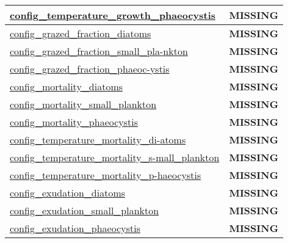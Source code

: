 {\begin{center}
\begin{longtable}{| p{2.0in} || p{4.0in} |}
    \hyperref[subsec:nm_sec_config_temperature_growth_phaeocystis]{config\_temperature\_growth\_phaeocystis} & {\bf \color{red} MISSING} \\
    \hline
    \hyperref[subsec:nm_sec_config_grazed_fraction_diatoms]{config\_grazed\_fraction\_diatoms} & {\bf \color{red} MISSING} \\
    \hline
    \hyperref[subsec:nm_sec_config_grazed_fraction_small_plankton]{config\_grazed\_fraction\_small\_pla-}\hyperref[subsec:nm_sec_config_grazed_fraction_small_plankton]{nkton}& {\bf \color{red} MISSING} \\
    \hline
    \hyperref[subsec:nm_sec_config_grazed_fraction_phaeocystis]{config\_grazed\_fraction\_phaeoc-}\hyperref[subsec:nm_sec_config_grazed_fraction_phaeocystis]{ystis}& {\bf \color{red} MISSING} \\
    \hline
    \hyperref[subsec:nm_sec_config_mortality_diatoms]{config\_mortality\_diatoms} & {\bf \color{red} MISSING} \\
    \hline
    \hyperref[subsec:nm_sec_config_mortality_small_plankton]{config\_mortality\_small\_plankton} & {\bf \color{red} MISSING} \\
    \hline
    \hyperref[subsec:nm_sec_config_mortality_phaeocystis]{config\_mortality\_phaeocystis} & {\bf \color{red} MISSING} \\
    \hline
    \hyperref[subsec:nm_sec_config_temperature_mortality_diatoms]{config\_temperature\_mortality\_di-}\hyperref[subsec:nm_sec_config_temperature_mortality_diatoms]{atoms}& {\bf \color{red} MISSING} \\
    \hline
    \hyperref[subsec:nm_sec_config_temperature_mortality_small_plankton]{config\_temperature\_mortality\_s-}\hyperref[subsec:nm_sec_config_temperature_mortality_small_plankton]{mall\_plankton}& {\bf \color{red} MISSING} \\
    \hline
    \hyperref[subsec:nm_sec_config_temperature_mortality_phaeocystis]{config\_temperature\_mortality\_p-}\hyperref[subsec:nm_sec_config_temperature_mortality_phaeocystis]{haeocystis}& {\bf \color{red} MISSING} \\
    \hline
    \hyperref[subsec:nm_sec_config_exudation_diatoms]{config\_exudation\_diatoms} & {\bf \color{red} MISSING} \\
    \hline
    \hyperref[subsec:nm_sec_config_exudation_small_plankton]{config\_exudation\_small\_plankton} & {\bf \color{red} MISSING} \\
    \hline
    \hyperref[subsec:nm_sec_config_exudation_phaeocystis]{config\_exudation\_phaeocystis} & {\bf \color{red} MISSING} \\

\end{longtable}
\end{center}}
